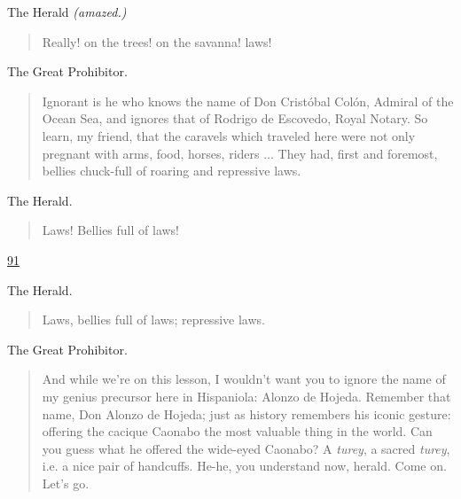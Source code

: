 \documentclass[letterpaper,article,12pt,oneside,notitlepage]{memoir}
\begin{document}
\begin{center}The Herald \textit{(amazed.)}\end{center}

\begin{verse}
Really! on the trees! on the savanna! laws! \\
\end{verse}

\begin{center}The Great Prohibitor.\end{center}

\begin{verse}
Ignorant is he who knows the name of Don Cristóbal Colón, Admiral of the Ocean Sea, and ignores that of Rodrigo de Escovedo, Royal Notary. So learn, my friend, that the caravels which traveled here were not only pregnant with arms, food, horses, riders ... They had, first and foremost, bellies chuck-full of roaring and repressive laws.  \\
\end{verse}

\begin{center}The Herald.\end{center}

\begin{verse}
\hspace{1cm} Laws! Bellies full of laws! \\
\end{verse}

\clearpage

\href{http://cesaire.elotroalex.com/chiens/chiens/p091.html}{91}

\begin{center}The Herald.\end{center}

\begin{verse}
\hspace{1cm} Laws, bellies full of laws; repressive laws. \\
\end{verse}

\begin{center}The Great Prohibitor.\end{center}

\begin{verse}
And while we're on this lesson, I wouldn't want you to ignore the name of my genius precursor here in Hispaniola: Alonzo de Hojeda. Remember that name, Don Alonzo de Hojeda; just as history remembers his iconic gesture: offering the cacique Caonabo the most valuable thing in the world. Can you guess what he offered the wide-eyed Caonabo? A \textit{turey}, a sacred \textit{turey}, i.e. a nice pair of handcuffs. He-he, you understand now, herald. Come on. Let's go.  \\
\end{verse}
\end{document}
